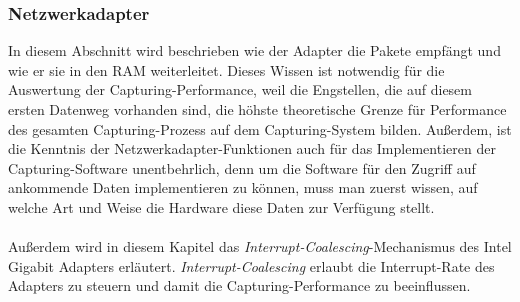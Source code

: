 {\subsubsection{Netzwerkadapter}\label{sec:adapter}
In diesem Abschnitt wird beschrieben wie der Adapter die Pakete empfängt und
wie er sie in den RAM weiterleitet. Dieses Wissen ist notwendig für die
Auswertung der Capturing-Performance, weil die Engstellen, die auf diesem
ersten Datenweg vorhanden sind, die höhste theoretische Grenze für Performance des gesamten
Capturing-Prozess auf dem Capturing-System bilden. Außerdem, ist die Kenntnis der
Netzwerkadapter-Funktionen auch für das Implementieren der Capturing-Software
unentbehrlich, denn um die Software für den Zugriff auf ankommende Daten
implementieren zu können, muss man zuerst wissen, auf welche Art und Weise die
Hardware diese Daten zur Verfügung stellt.\\\\
%
Außerdem wird in diesem Kapitel das \emph{Interrupt-Coalescing}-Mechanismus des
Intel Gigabit Adapters erläutert. \emph{Interrupt-Coalescing} erlaubt 
die Interrupt-Rate des Adapters zu steuern und damit die Capturing-Performance  zu 
beeinflussen. \\\\
%

}
